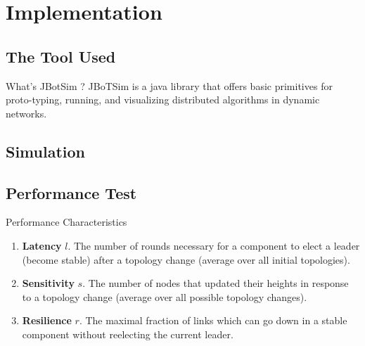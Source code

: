 \documentclass{beamer}
\begin{document}
\section{Implementation}
\subsection{The Tool Used}

\begin{frame}{What's JBotSim ?}
JBoTSim is a java library that offers basic primitives for proto-typing, running, and visualizing distributed algorithms in dynamic networks.
\end{frame}

\subsection{Simulation}
\begin{frame}





\end{frame}

\subsection{Performance Test}

\begin{frame}{Performance Characteristics}
	\begin{enumerate}
		\item \textbf{Latency} $l$. The number of rounds necessary for a component to elect a leader (become stable) after a topology change (average over all initial topologies).
		
		\item \textbf{Sensitivity} $s$. The number of nodes that updated their heights in response to a topology change (average over all possible topology changes).
		
		\item \textbf{Resilience} $r$. The maximal fraction of links which can go down in a stable component without reelecting the current leader.
		
	\end{enumerate}
\end{frame}
\end{document}
